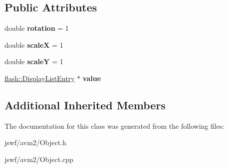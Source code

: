 \subsection*{Public Attributes}
\begin{DoxyCompactItemize}
\item 
\hypertarget{classjswf_1_1avm2_1_1_display_object_a8786424f1b28392cdef1ed13b97d9493}{double {\bfseries rotation} = 1}\label{classjswf_1_1avm2_1_1_display_object_a8786424f1b28392cdef1ed13b97d9493}

\item 
\hypertarget{classjswf_1_1avm2_1_1_display_object_ad124b9b28b42663f930a774dd84ce7b8}{double {\bfseries scale\+X} = 1}\label{classjswf_1_1avm2_1_1_display_object_ad124b9b28b42663f930a774dd84ce7b8}

\item 
\hypertarget{classjswf_1_1avm2_1_1_display_object_a6f0c828bb8025f81a81f878687272b44}{double {\bfseries scale\+Y} = 1}\label{classjswf_1_1avm2_1_1_display_object_a6f0c828bb8025f81a81f878687272b44}

\item 
\hypertarget{classjswf_1_1avm2_1_1_display_object_a7b52b41f451ff9950140e25e4f7343a3}{\hyperlink{structjswf_1_1flash_1_1_display_list_entry}{flash\+::\+Display\+List\+Entry} $\ast$ {\bfseries value}}\label{classjswf_1_1avm2_1_1_display_object_a7b52b41f451ff9950140e25e4f7343a3}

\end{DoxyCompactItemize}
\subsection*{Additional Inherited Members}


The documentation for this class was generated from the following files\+:\begin{DoxyCompactItemize}
\item 
jswf/avm2/Object.\+h\item 
jswf/avm2/Object.\+cpp\end{DoxyCompactItemize}
